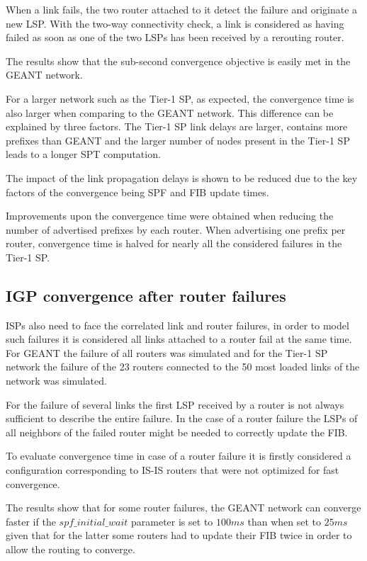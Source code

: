 \documentclass[a4paper, 11pt]{article}
\begin{document}
When a link fails, the two router attached to it detect the failure and originate a new LSP. 
With the two-way connectivity check, 
a link is considered as having failed as soon as one of the two LSPs has been received by a rerouting router.

The results show that the sub-second convergence objective is easily met in the GEANT network.

For a larger network such as the Tier-1 SP, as expected, the convergence time is also larger when comparing to the GEANT network.
This difference can be explained by three factors.
The Tier-1 SP link delays are larger, contains more prefixes than GEANT and the larger number of nodes present in the Tier-1 SP leads to a longer SPT computation.

The impact of the link propagation delays is shown to be reduced due to the key factors of the convergence being SPF and FIB update times.

Improvements upon the convergence time were obtained when reducing the number of advertised prefixes by each router. When advertising one prefix per router, convergence time is halved for nearly all the considered failures in the Tier-1 SP.

\subsection{IGP convergence after router failures}
ISPs also need to face the correlated link and router failures, in order to model such failures it is considered all links attached to a router fail at the same time.
For GEANT the failure of all routers was simulated and for the Tier-1 SP network the failure of the 23 routers connected to the 50 most loaded links of the network was simulated.

For the failure of several links the first LSP received by a router is not always sufficient to describe the entire failure. In the case of a router failure the LSPs of all neighbors of the failed router might be needed to correctly update the FIB.

To evaluate convergence time in case of a router failure it is firstly considered a configuration corresponding to IS-IS routers that were not optimized for fast convergence.

The results show that for some router failures, the GEANT network can converge faster if the $spf\_initial\_wait$ parameter is set to $100ms$ than when set to $25ms$ given that for the latter some routers had to update their FIB twice in order to allow the routing to converge.
\end{document}
